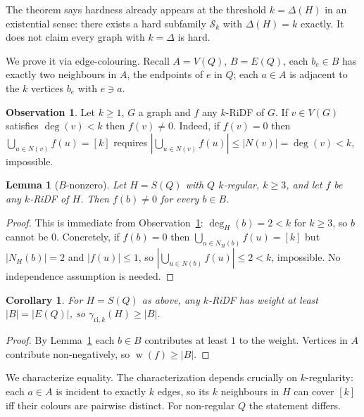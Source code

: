 \documentclass[11pt,a4paper]{article}
\theoremstyle{plain}
\newtheorem{lemma}[theorem]{Lemma}
\newtheorem{corollary}[theorem]{Corollary}
\theoremstyle{definition}
\newtheorem{observation}[theorem]{Observation}
\DeclareMathOperator{\weight}{w}
\newcommand{\gri}{\gamma_{\mathrm{ri},k}}
\newcommand{\setK}{[k]}
\newcommand{\cS}{\mathcal{S}}
\begin{document}
The theorem says hardness already appears at the threshold $k=\Delta(H)$ in an existential sense: there exists a hard subfamily $\cS_{k}$ with $\Delta(H)=k$ exactly. It does not claim every graph with $k=\Delta$ is hard.

We prove it via edge-colouring. Recall $A=V(Q)$, $B=E(Q)$, each $b_{e}\in B$ has exactly two neighbours in $A$, the endpoints of $e$ in $Q$; each $a\in A$ is adjacent to the $k$ vertices $b_{e}$ with $e\ni a$.

\begin{observation}\label{obs:degk}
Let $k\ge1$, $G$ a graph and $f$ any $k$-RiDF of $G$. If $v\in V(G)$ satisfies $\deg(v)<k$ then $f(v)\neq0$. Indeed, if $f(v)=0$ then $\bigcup_{u\in N(v)}f(u)=\setK$ requires $|\bigcup_{u\in N(v)}f(u)|\le |N(v)|=\deg(v)<k$, impossible.
\end{observation}

\begin{lemma}[$B$-nonzero]\label{lem:Bnonzero}
Let $H=S(Q)$ with $Q$ $k$-regular, $k\ge 3$, and let $f$ be any $k$-RiDF of $H$. Then $f(b)\neq0$ for every $b\in B$.
\end{lemma}
\begin{proof}
This is immediate from Observation~\ref{obs:degk}: $\deg_{H}(b)=2<k$ for $k\ge3$, so $b$ cannot be $0$. Concretely, if $f(b)=0$ then $\bigcup_{u\in N_{H}(b)}f(u)=\setK$ but $|N_{H}(b)|=2$ and $|f(u)|\le1$, so $|\bigcup_{u\in N(b)}f(u)|\le2<k$, impossible. No independence assumption is needed.
\end{proof}

\begin{corollary}\label{cor:lowerbound}
For $H=S(Q)$ as above, any $k$-RiDF has weight at least $|B|=|E(Q)|$, so $\gri(H)\ge|B|$.
\end{corollary}
\begin{proof}
By Lemma~\ref{lem:Bnonzero} each $b\in B$ contributes at least $1$ to the weight. Vertices in $A$ contribute non-negatively, so $\weight(f)\ge|B|$.
\end{proof}

We characterize equality. The characterization depends crucially on $k$-regularity: each $a\in A$ is incident to exactly $k$ edges, so its $k$ neighbours in $H$ can cover $\setK$ iff their colours are pairwise distinct. For non-regular $Q$ the statement differs.
\end{document}
